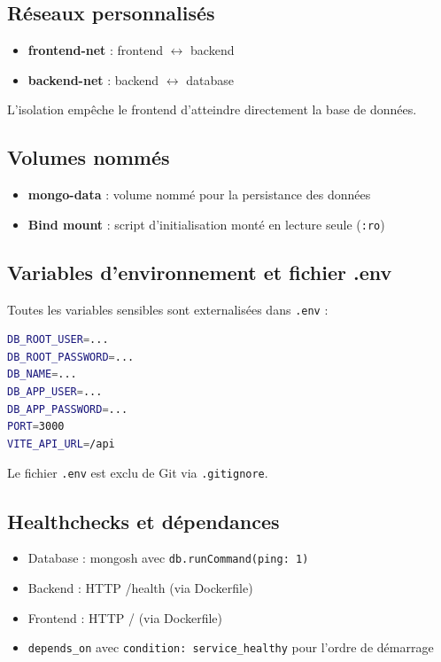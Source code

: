 \documentclass[12pt,a4paper]{report}
\begin{document}
\subsection{Réseaux personnalisés}
\begin{itemize}
\item \textbf{frontend-net} : frontend $\leftrightarrow$ backend
\item \textbf{backend-net} : backend $\leftrightarrow$ database
\end{itemize}
L'isolation empêche le frontend d'atteindre directement la base de données.

\subsection{Volumes nommés}
\begin{itemize}
\item \textbf{mongo-data} : volume nommé pour la persistance des données
\item \textbf{Bind mount} : script d'initialisation monté en lecture seule (\texttt{:ro})
\end{itemize}

\subsection{Variables d'environnement et fichier .env}

Toutes les variables sensibles sont externalisées dans \texttt{.env} :

\begin{lstlisting}[language=bash]
DB_ROOT_USER=...
DB_ROOT_PASSWORD=...
DB_NAME=...
DB_APP_USER=...
DB_APP_PASSWORD=...
PORT=3000
VITE_API_URL=/api
\end{lstlisting}

Le fichier \texttt{.env} est exclu de Git via \texttt{.gitignore}.

\subsection{Healthchecks et dépendances}
\begin{itemize}
\item Database : mongosh avec \texttt{db.runCommand({ping: 1})}
\item Backend : HTTP /health (via Dockerfile)
\item Frontend : HTTP / (via Dockerfile)
\item \texttt{depends\_on} avec \texttt{condition: service\_healthy} pour l'ordre de démarrage
\end{itemize}
\end{document}
